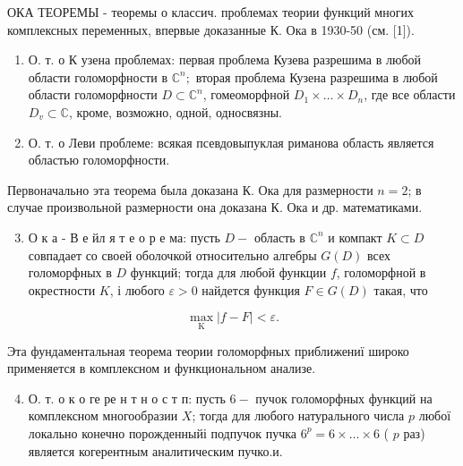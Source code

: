 \documentclass[10pt]{article}
\begin{document}
ОКА ТЕОРЕМЫ - теоремы о классич. проблемах теории функций многих комплексных переменных, впервые доказанные К. Ока в 1930-50 (см. [1]).



\begin{enumerate}

  \item О. т. о К узена проблемах: первая проблема Кузева разрешима в любой области голоморфности в $\mathbb{C}^{n} ;$ вторая проблема Кузена разрешима в любой области голоморфности $D \subset \mathbb{C}^{n}$, гомеоморфной $D_{1} \times \ldots \times D_{n}$, где все области $D_{v} \subset \mathbb{C}$, кроме, возможно, одной, односвязны.



  \item О. т. о Леви проблеме: всякая псевдовыпуклая риманова область является областью голоморфности.



\end{enumerate}



Первоначально эта теорема была доказана К. Ока для размерности $n=2$; в случае произвольной размерности она доказана К. Ока и др. математиками.



\begin{enumerate}

  \setcounter{enumi}{2}

  \item О к а - В е йл я т е о р е ма: пусть $D-$ область в $\mathbb{C}^{n}$ и компакт $K \subset D$ совпадает со своей оболочкой относительно алгебры $G(D)$ всех голоморфных в $D$ функций; тогда для любой функции $f$, голоморфной в окрестности $K$, і любого $\varepsilon>0$ найдется функция $F \in G(D)$ такая, что

\end{enumerate}



\[

\max _{\mathrm{K}}|f-F|<\varepsilon .

\]



Эта фундаментальная теорема теории голоморфных приближениї широко применяется в комплексном и функциональном анализе.



\begin{enumerate}

  \setcounter{enumi}{3}

  \item О. т. о к о ге ре н т н о с т п: пусть $6-$ пучок голоморфных функций на комплексном многообразии $X$; тогда для любого натурального числа $p$ любої локально конечно порожденныйі подпучок пучка $6^{p}=6 \times \ldots \times 6$ ( $p$ раз) является когерентным аналитическим пучко.и.

\end{enumerate}
\end{document}
